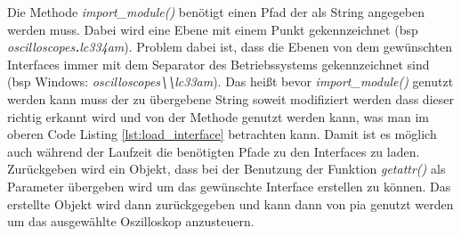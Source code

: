 
 Die Methode \textit{import\_module()} benötigt einen Pfad der als String angegeben werden muss. Dabei wird eine Ebene mit einem Punkt gekennzeichnet (\ac{bsp} \textit{oscilloscopes\textbf{.}lc334am}). Problem dabei ist, dass die Ebenen von dem gewünschten Interfaces immer mit dem Separator des Betriebssystems gekennzeichnet sind (\ac{bsp} Windows: \textit{oscilloscopes\textbf{\textbackslash\textbackslash}lc33am}). Das heißt bevor \textit{import\_module()} genutzt werden kann muss der zu übergebene String soweit modifiziert werden dass dieser richtig erkannt wird und von der Methode genutzt werden kann, was man im oberen Code Listing \ref{lst:load_interface} betrachten kann. Damit ist es möglich auch während der Laufzeit die benötigten Pfade zu den Interfaces zu laden. Zurückgeben wird ein Objekt, dass bei der Benutzung der Funktion \textit{getattr()} als Parameter übergeben wird um das gewünschte Interface erstellen zu können. Das erstellte Objekt wird dann zurückgegeben und kann dann von \ac{pia} genutzt werden um das ausgewählte Oszilloskop anzusteuern.